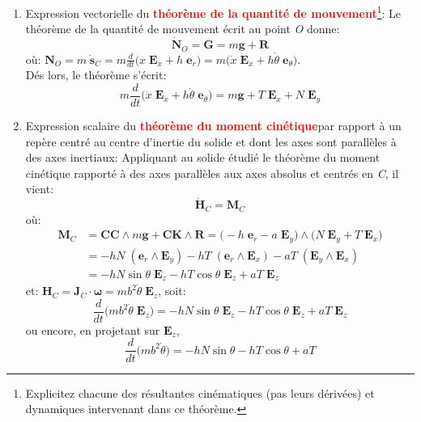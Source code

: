\documentclass[a4paper]{article}
\begin{document}
\begin{enumerate}





\item Expression vectorielle du \textcolor{red}{\textbf{théorème de la quantité de mouvement}}\footnote{Explicitez chacune des résultantes cinématiques (pas leurs dérivées) et dynamiques intervenant dans ce théorème.}: Le théorème de la quantité de mouvement écrit au point \emph{O} donne:
\[ \dot{\textbf{N}}_O = \textbf{G} = m \textbf{g} + \textbf{R} \]
où: $\displaystyle \textbf{N}_O = m \; \dot{\textbf{s}}_C = m \frac{d}{d t} \big( x \; \textbf{E}_x + h \; \textbf{e}_r \big) = m \big( \dot{x} \; \textbf{E}_x + h \dot{\theta} \; \textbf{e}_\theta \big) $. \\
Dés lors, le théorème s'écrit: 
\[ m \frac{d}{d t} \big( \dot{x} \; \textbf{E}_x + h \dot{\theta} \; \textbf{e}_\theta \big) = m \textbf{g} + T \; \textbf{E}_x + N \; \textbf{E}_y \]





\item Expression scalaire du \textcolor{red}{\textbf{théorème du moment cinétique}}\footnotemark[\value{footnote}] par rapport à un repère centré au centre d’inertie du solide et dont les axes sont parallèles à des axes inertiaux: Appliquant au solide étudié le théorème du moment cinétique rapporté à des axes parallèles aux axes absolus et centrés en \emph{C}, il vient:
\[ \dot{\textbf{H}}_C = \textbf{M}_C \]
où:
\[ \begin{aligned}
\textbf{M}_C &= \textbf{CC} \wedge m \textbf{g} + \textbf{CK} \wedge \textbf{R} = \big( -h \; \textbf{e}_r - a \; \textbf{E}_y \big) \wedge \big( N \; \textbf{E}_y + T \; \textbf{E}_x \big) \\
&= - h N \; (\textbf{e}_r \wedge \textbf{E}_y) - h T \; (\textbf{e}_r \wedge \textbf{E}_x) - a T \; (\textbf{E}_y \wedge \textbf{E}_x) \\
&= - h N \sin \theta \; \textbf{E}_z - h T \cos \theta \; \textbf{E}_z + a T \; \textbf{E}_z
\end{aligned} \]
et: $\displaystyle \textbf{H}_C = \textbf{J}_C \cdot \boldsymbol{\omega} = m b^2 \dot{\theta} \; \textbf{E}_z $, soit:
\[ \frac{d}{d t} \big( m b^2 \dot{\theta} \; \textbf{E}_z \big) = - h N \sin \theta \; \textbf{E}_z - h T \cos \theta \; \textbf{E}_z + a T \; \textbf{E}_z \]
ou encore, en projetant sur $ \textbf{E}_z $,
\[ \frac{d}{d t} \big( m b^2 \dot{\theta} \big) = - h N \sin \theta - h T \cos \theta + a T \]






\end{enumerate}
\end{document}
